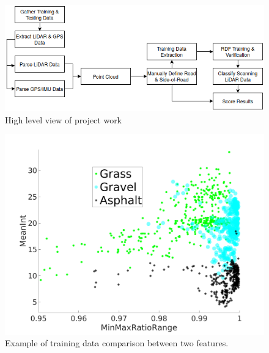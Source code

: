 \documentclass[balance,upint,subscriptcorrection,varvw,mathalfa=cal=boondoxo,colorlinks]{asmeconf}
\begin{document}
	\begin{figure}
		\centering
		\includegraphics[width=\linewidth]{figures/flowz_2}
		\caption[Project Flow]{High level view of project work}
		\label{fig:flowz_2}
	\end{figure}

	\begin{figure}
		\centering
		\includegraphics[width=\linewidth]{figures/training_data_cluster}
		\caption[Example Clustering]{Example of training data comparison between two features.}
		\label{fig:training_data_cluster}
	\end{figure}
\end{document}
